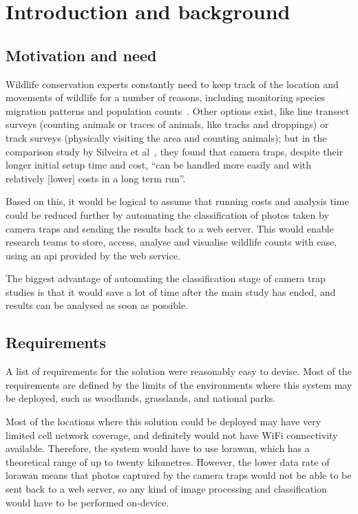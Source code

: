 
\chapter{Introduction and background}

\section{Motivation and need}
Wildlife conservation experts constantly need to keep track of the location
and movements of wildlife for a number of reasons, including monitoring
species migration patterns and population
counts~\cite{karanth1995estimating}. Other options exist, like line transect
surveys (counting animals or traces of animals, like tracks and droppings) or
track surveys (physically visiting the area and counting animals); but in the
comparison study by Silveira et al~\parencite{silveira2003camera}, they found
that camera traps, despite their longer initial setup time and cost, ``can be
handled more easily and with relatively [lower] costs in a long term run''.

Based on this, it would be logical to assume that running costs and analysis
time could be reduced further by automating the classification of photos
taken by camera traps and sending the results back to a web server. This
would enable research teams to store, access, analyse and visualise wildlife
counts with ease, using an \acrfull{api} provided by the web service.

The biggest advantage of automating the classification stage of camera trap
studies is that it would save a lot of time after the main study has ended,
and results can be analysed as soon as possible.

\section{Requirements}

A list of requirements for the solution were reasonably easy to devise. Most
of the requirements are defined by the limits of the environments where this
system may be deployed, such as woodlands, grasslands, and national parks.

Most of the locations where this solution could be deployed may have very
limited cell network coverage, and definitely would not have WiFi
connectivity available. Therefore, the system would have to use
\gls{lorawan}, which has a theoretical range of up to twenty kilometres.
However, the lower data rate of \gls{lorawan} means that photos captured by
the camera traps would not be able to be sent back to a web server, so any
kind of image processing and classification would have to be performed
on-device.


